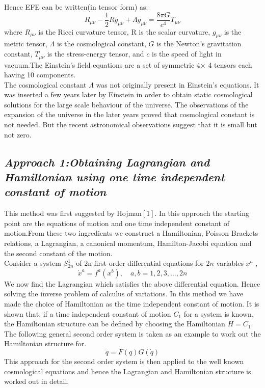 \documentclass[14pt]{extarticle}
\begin{document}
Hence EFE can be written(in tensor form) as: \\
\begin{equation}
R_{\mu \nu}-\frac{1}{2} R g_{\mu \nu}+\Lambda g_{\mu \nu}=\frac{8 \pi G}{c^{4}} T_{\mu \nu}
\end{equation}
where $R_{\mu \nu}$ is the Ricci curvature tensor, R is the scalar curvature, $g_{\mu \nu}$ is the metric tensor, $\Lambda$ is the  cosmological constant, $G$ is the Newton's gravitation constant, $T_{\mu \nu}$ is the stress-energy tensor, and $c$ is the speed of light in vacuum.The Einstein's field equations are a set of symmetric 4$\times$ 4 tensors each having 10 components.\\
The cosmological constant $\Lambda$ was not originally present in Einstein's equations. It was inserted a few years later by Einstein in order to obtain static cosmological solutions for the large scale behaviour of the universe. The observations of the expansion of the universe in the later years proved that cosmological constant is not needed. But the recent astronomical observations suggest that it is small but not zero.\\

\subsection*{\textit{Approach 1:Obtaining Lagrangian and Hamiltonian  using one time independent constant of motion}}
This method was first suggested by Hojman$[1]$. In this approach the starting point are the equations of motion and one time independent constant of motion.From these two ingredients we construct a Hamiltonian, Poisson Brackets relations, a Lagrangian, a canonical momentum, Hamilton-Jacobi equation and the second constant of the motion.\\
Consider a system $S^{1}_{2 n}$ of 2n first order differential equations for $2n$ variables $x^{a}$ ,\\
\begin{equation}
\dot{x}^{a}=f^{a}\left(x^{b}\right), \quad a, b=1,2,3, \ldots, 2 n
\end{equation}
We now find the Lagrangian which satisfies the above differential equation. Hence solving the inverse problem of calculus of variations. In this method we have made the choice of Hamiltonian as the time independent constant of motion. It is shown that, if a time independent constant of motion $C_{1}$ for a system is known, the Hamiltonian structure can be defined by choosing the Hamiltonian $H=C_{1}$. The following general second order system is taken as an example to work out the Hamiltonian structure for.   \\
\begin{equation}
\ddot{q}=F(q) G(\dot{q})
\end{equation}
This approach for the second order system is then applied to the well known cosmological equations and hence the Lagrangian and Hamiltonian structure is worked out in detail.\\
\end{document}
